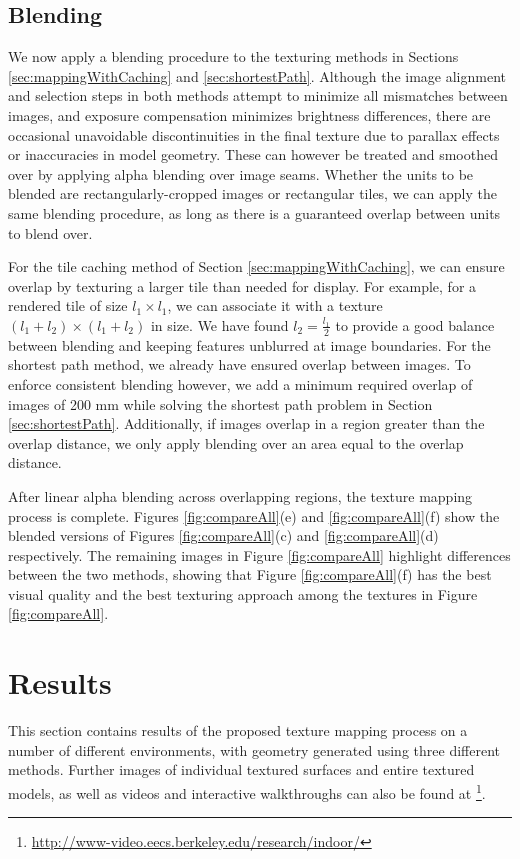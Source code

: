 \documentclass[]{spie}  %
\begin{document}
\subsection{Blending}
\label{sec:blending}
We now apply a blending procedure to the texturing methods in Sections
\ref{sec:mappingWithCaching} and \ref{sec:shortestPath}. Although the
image alignment and selection steps in both methods attempt to
minimize all mismatches between images, and exposure compensation
minimizes brightness differences, there are occasional unavoidable
discontinuities in the final texture due to parallax effects or
inaccuracies in model geometry. These can however be treated and
smoothed over by applying alpha blending over image seams.  Whether
the units to be blended are rectangularly-cropped images or
rectangular tiles, we can apply the same blending procedure, as long
as there is a guaranteed overlap between units to blend over.

For the tile caching method of Section \ref{sec:mappingWithCaching},
we can ensure overlap by texturing a larger tile than needed for
display. For example, for a rendered tile of size $l_1 \times l_1$, we
can associate it with a texture $(l_1 + l_2) \times (l_1 + l_2)$ in
size.  We have found $l_2 = \frac{l_1}{2}$ to provide a good balance
between blending and keeping features unblurred at image
boundaries. For the shortest path method, we already have ensured
overlap between images. To enforce consistent blending however, we add
a minimum required overlap of images of 200 mm while solving the
shortest path problem in Section \ref{sec:shortestPath}. Additionally,
if images overlap in a region greater than the overlap distance, we
only apply blending over an area equal to the overlap distance.

After linear alpha blending across overlapping regions, the texture
mapping process is complete. Figures \ref{fig:compareAll}(e) and
\ref{fig:compareAll}(f) show the blended versions of Figures
\ref{fig:compareAll}(c) and \ref{fig:compareAll}(d) respectively. The
remaining images in Figure \ref{fig:compareAll} highlight differences
between the two methods, showing that Figure \ref{fig:compareAll}(f)
has the best visual quality and the best texturing approach among the
textures in Figure \ref{fig:compareAll}.



\section{Results}
\label{sec:results}
This section contains results of the proposed texture mapping process
on a number of different environments, with geometry generated using
three different methods. Further images of individual textured
surfaces and entire textured models, as well as videos and interactive
walkthroughs can also be found at
\footnote{\url{http://www-video.eecs.berkeley.edu/research/indoor/}}.
\end{document}
